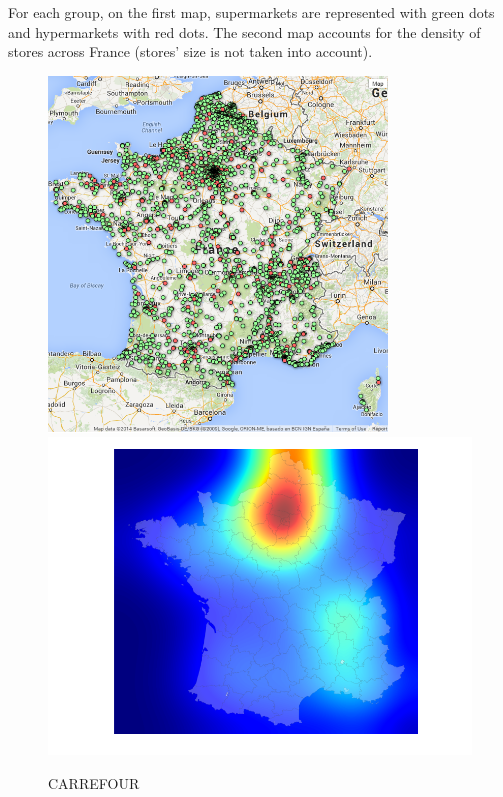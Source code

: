 \documentclass[11pt]{article}
\begin{document}
For each group, on the first map, supermarkets are represented with green dots and hypermarkets with red dots. The second map accounts for the density of stores across France (stores' size is not taken into account).

\begin{figure}[H]
    \caption{CARREFOUR}
	\centering
		\includegraphics[width=9cm]{images/maps_group_dots/CARREFOUR.png}
        \includegraphics[width=12.8cm]{images/maps_group_heatmaps/CARREFOUR.png}
\end{figure}
\end{document}

